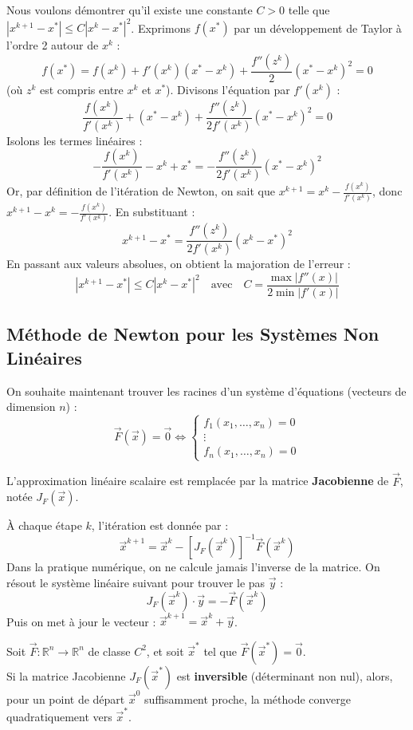 \begin{explication}
Nous voulons démontrer qu'il existe une constante $C > 0$ telle que $|x^{k+1} - x^*| \leq C |x^k - x^*|^2$.
Exprimons $f(x^*)$ par un développement de Taylor à l'ordre 2 autour de $x^k$ :
$$f(x^*) = f(x^k) + f'(x^k)(x^* - x^k) + \frac{f''(z^k)}{2}(x^* - x^k)^2 = 0$$
(où $z^k$ est compris entre $x^k$ et $x^*$). Divisons l'équation par $f'(x^k)$ :
$$\frac{f(x^k)}{f'(x^k)} + (x^* - x^k) + \frac{f''(z^k)}{2f'(x^k)}(x^* - x^k)^2 = 0$$
Isolons les termes linéaires :
$$-\frac{f(x^k)}{f'(x^k)} - x^k + x^* = -\frac{f''(z^k)}{2f'(x^k)}(x^* - x^k)^2$$
Or, par définition de l'itération de Newton, on sait que $x^{k+1} = x^k - \frac{f(x^k)}{f'(x^k)}$, donc $x^{k+1} - x^k = -\frac{f(x^k)}{f'(x^k)}$. En substituant :
$$x^{k+1} - x^* = \frac{f''(z^k)}{2f'(x^k)}(x^k - x^*)^2$$
En passant aux valeurs absolues, on obtient la majoration de l'erreur :
$$|x^{k+1} - x^*| \leq C |x^k - x^*|^2 \quad \text{avec} \quad C = \frac{\max |f''(x)|}{2 \min |f'(x)|}$$
\end{explication}

\subsection{Méthode de Newton pour les Systèmes Non Linéaires}

On souhaite maintenant trouver les racines d'un système d'équations (vecteurs de dimension $n$) :
$$\vec{F}(\vec{x}) = \vec{0} \iff \begin{cases} f_1(x_1, \dots, x_n) = 0 \\ \vdots \\ f_n(x_1, \dots, x_n) = 0 \end{cases}$$

L'approximation linéaire scalaire est remplacée par la matrice \textbf{Jacobienne} de $\vec{F}$, notée $J_F(\vec{x})$.

\begin{definition}
À chaque étape $k$, l'itération est donnée par :
$$\vec{x}^{k+1} = \vec{x}^k - [J_F(\vec{x}^k)]^{-1} \vec{F}(\vec{x}^k)$$
Dans la pratique numérique, on ne calcule jamais l'inverse de la matrice. On résout le système linéaire suivant pour trouver le pas $\vec{y}$ :
$$J_F(\vec{x}^k) \cdot \vec{y} = -\vec{F}(\vec{x}^k)$$
Puis on met à jour le vecteur : $\vec{x}^{k+1} = \vec{x}^k + \vec{y}$.
\end{definition}

\begin{theoreme}
Soit $\vec{F} : \mathbb{R}^n \to \mathbb{R}^n$ de classe $C^2$, et soit $\vec{x}^*$ tel que $\vec{F}(\vec{x}^*) = \vec{0}$.\\
Si la matrice Jacobienne $J_F(\vec{x}^*)$ est \textbf{inversible} (déterminant non nul), alors, pour un point de départ $\vec{x}^0$ suffisamment proche, la méthode converge quadratiquement vers $\vec{x}^*$.
\end{theoreme}

